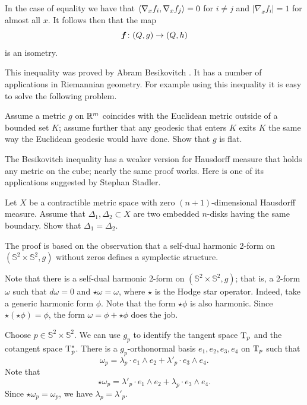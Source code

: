In the case of equality we have that $\langle\nabla_x f_i,\nabla_x f_j\rangle=0$ for $i\ne j$ 
and $|\nabla_x f_i|=1$ for almost all $x$.
It follows then that the map 
\[\bm{f}\:(Q,g)\z\to (Q,h)\] 
is an isometry.
\qeds

This inequality was proved by Abram Besikovitch \cite{besicovitch}.
It has a number of applications in Riemannian geometry.
For example using this inequality it is easy to solve the following problem.

\begin{pr}
Assume a metric $g$ on $\mathbb{R}^m$ coincides with the Euclidean metric outside of a bounded set $K$;
assume further that any geodesic that enters $K$ exits $K$ the same way the Euclidean geodesic would have done. 
Show that $g$ is flat.
\end{pr}


The Besikovitch inequality has a weaker version for Hausdorff measure that holds any metric on the cube;
nearly the same proof works.
Here is one of its applications suggested by Stephan Stadler.

\begin{pr}
Let $X$ be a contractible metric space with zero $(n+1)$-dimensional Hausdorff measure.
Assume that $\Delta_1,\Delta_2\subset X$ are two embedded $n$-disks having the same boundary.
Show that $\Delta_1=\Delta_2$.
\end{pr}



The proof is based on the observation that a self-dual harmonic 2-form on $(\mathbb{S}^2\times\mathbb{S}^2,g)$
without zeros defines a symplectic structure.

\medskip

Note that there is a self-dual harmonic 2-form on $(\mathbb{S}^2\times\mathbb{S}^2,g)$;
that is, a 2-form $\omega$ such that $d\omega=0$ and $\star\omega=\omega$,
where $\star$ is the Hodge star operator.
Indeed, take a generic harmonic form $\phi$.
Note that the form $\star\phi$ is also harmonic.
Since $\star(\star\phi)=\phi$,
the form $\omega=\phi+\star\phi$ does the job.

Choose $p\in \mathbb{S}^2\times\mathbb{S}^2$.
We can use $g_p$ to identify the tangent space $\mathrm{T}_p$ and the cotangent space $\mathrm{T}^*_p$.
There is a $g_p$-orthonormal basis $e_1, e_2, e_3, e_4$ on $\mathrm{T}_p$ such that 
\[\omega_p=\lambda_p\cdot e_1\wedge e_2+\lambda'_p\cdot  e_3\wedge e_4.\]
Note that 
\[\star\omega_p=\lambda'_p\cdot e_1\wedge e_2+\lambda_p\cdot  e_3\wedge e_4.\]
Since $\star\omega_p=\omega_p$, we have $\lambda_p=\lambda'_p$.

